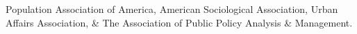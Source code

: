 

\begin{cvparagraph}

Population Association of America, American Sociological Association, Urban Affairs Association, \& The Association of Public Policy Analysis \& Management.
\end{cvparagraph}